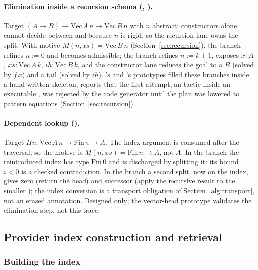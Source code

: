 \paragraph{Elimination inside a recursion schema (, ).} Target $(A \to B) \to \mathrm{Vec}\,A\,n \to \mathrm{Vec}\,B\,n$ with $n$ abstract: constructors alone cannot decide between  and  because $n$ is rigid, so the recursion lane owns the split. With motive $M(n, xs) = \mathrm{Vec}\,B\,n$ (Section~\ref{sec:recursion}), the  branch refines $n := 0$ and  becomes admissible; the  branch refines $n := k+1$, exposes $x : A$, $xs : \mathrm{Vec}\,A\,k$, $ih : \mathrm{Vec}\,B\,k$, and the constructor lane reduces the goal to a $B$ (solved by $f\,x$) and a tail (solved by $ih$). 's and 's prototypes filled these branches inside a hand-written skeleton;  reports that the first attempt, an  tactic inside an executable , was rejected by the code generator until the plan was lowered to pattern equations (Section~\ref{sec:recursion}).

\paragraph{Dependent lookup ().} Target $\Pi n.\ \mathrm{Vec}\,A\,n \to \mathrm{Fin}\,n \to A$. The index argument is consumed after the traversal, so the motive is $M(n, xs) = \mathrm{Fin}\,n \to A$, not $A$. In the  branch the reintroduced index has type $\mathrm{Fin}\,0$ and is discharged by splitting it: its bound $i < 0$ is a checked contradiction. In the  branch a second split, now on the index, gives zero (return the head) and successor (apply the recursive result to the smaller ); the index conversion is a transport obligation of Section~\ref{alg:transport}, not an erased annotation. Designed only; the vector-head prototype validates the elimination step, not this trace.

\subsection{Provider index construction and retrieval}\label{alg:index}

\subsubsection{Building the index}

